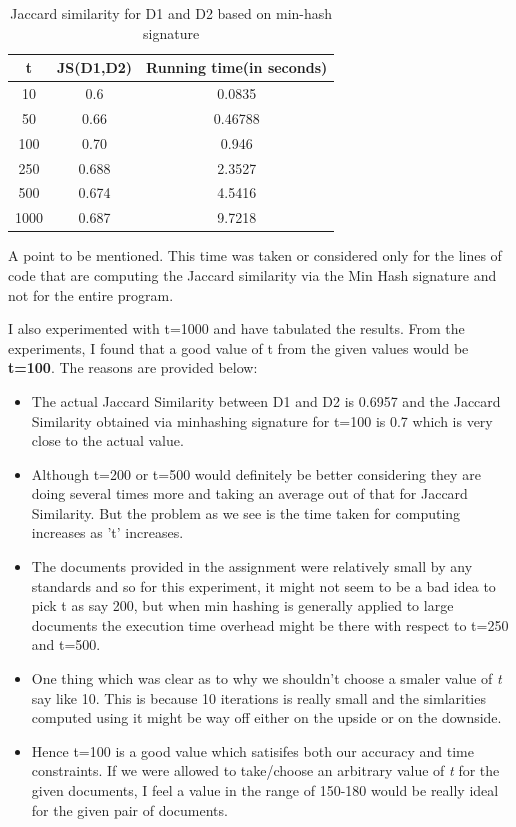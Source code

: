 \documentclass[11pt]{article}
\begin{document}
\begin{itemize}
 \begin{table}[h]
 	\centering
 	\begin{tabular}{|c|c|c|}
 		\hline
 		\textbf{t} & \textbf{JS(D1,D2)}  & Running time(in seconds) \\
 		\hline
 		10 &  0.6 &  0.0835\\
 		\hline
 		50 &    0.66 &  0.46788  \\
 		\hline
 		100 &   0.70  &  0.946 \\
 		\hline
 		250 &    0.688 &  2.3527\\
 		\hline
 		500 &  0.674 & 4.5416\\
 		\hline
 		1000 &  0.687 & 9.7218\\
 		\hline
 	\end{tabular}
 	\caption{Jaccard similarity for D1 and D2 based on min-hash signature }
 	\label{t2}
 \end{table}
 
 
 A point to be mentioned. This time was taken or considered only for the lines of code that are  computing the Jaccard similarity via the Min Hash signature and not for the entire program.
 
 I also experimented with t=1000 and have tabulated the results. From the experiments, I found that a good value of t from the given values would be \textbf{t=100}. The reasons are provided below:
 
 \begin{itemize}
 	\item The actual Jaccard Similarity between D1 and D2 is 0.6957 and the Jaccard Similarity obtained via minhashing signature for t=100 is 0.7 which is very close to the actual value.
 	
 	\item Although t=200 or t=500 would definitely be better considering they are doing several times more and taking an average out of that for Jaccard Similarity. But the problem as we see is the time taken for computing increases  as 't' increases.
 	
 	\item The documents provided in the assignment were relatively small by any standards and so for this experiment, it might not seem to be a bad idea to pick t as say 200, but when min hashing is generally applied to large documents the execution time overhead might be there with respect to t=250 and t=500.
 	
 	\item One thing which was clear as to why we shouldn't choose a smaler value of \emph{t} say like 10. This is because 10  iterations is really small and the simlarities computed using it might be way off either on the upside or on the downside.
 	
 	\item Hence t=100 is a good value which satisifes both our accuracy and time constraints. If we were allowed to take/choose an arbitrary value of \emph{t} for the given documents, I feel a value in the range of 150-180 would be really ideal for the given pair of documents. \\
 \end{itemize}
 
 
\end{itemize}
\end{document}
